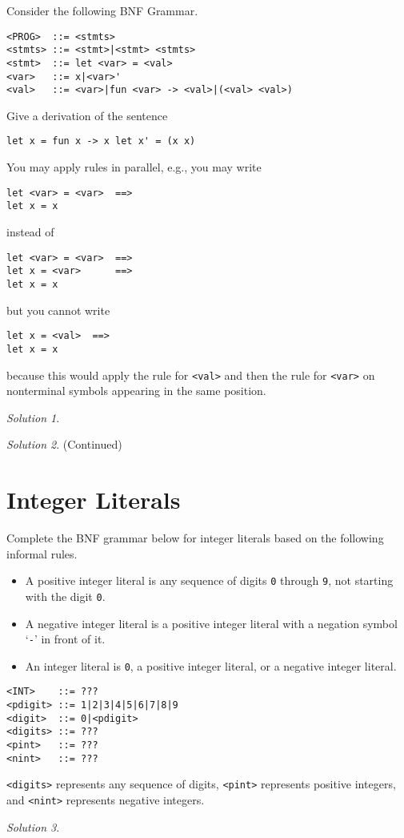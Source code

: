 \documentclass{article}
\theoremstyle{remark} \newtheorem*{solution}{Solution}
\begin{document}
Consider the following BNF Grammar.
\begin{lstlisting}
<PROG>  ::= <stmts>
<stmts> ::= <stmt>|<stmt> <stmts>
<stmt>  ::= let <var> = <val>
<var>   ::= x|<var>'
<val>   ::= <var>|fun <var> -> <val>|(<val> <val>)
\end{lstlisting}
Give a derivation of the sentence
\begin{lstlisting}
let x = fun x -> x let x' = (x x)
\end{lstlisting}
You may apply rules in parallel, e.g., you may write
\begin{lstlisting}
let <var> = <var>  ==>
let x = x
\end{lstlisting}
instead of
\begin{lstlisting}
let <var> = <var>  ==>
let x = <var>      ==>
let x = x
\end{lstlisting}
but you cannot write
\begin{lstlisting}
let x = <val>  ==>
let x = x
\end{lstlisting}
because this would apply the rule for \texttt{<val>} and then the rule
for \texttt{<var>} on nonterminal symbols appearing in the same
position.

\begin{solution}
\end{solution}

\pagebreak
\begin{solution}
(Continued)
\end{solution}

\pagebreak
\section{Integer Literals}

Complete the BNF grammar below for integer literals based on the following informal rules.
\begin{itemize}
\item A positive integer literal is any sequence of digits \texttt{0} through \texttt{9}, not starting with the digit \texttt{0}.
\item A negative integer literal is a positive integer literal with a negation symbol `\texttt{-}' in front of it.
\item An integer literal is \texttt{0}, a positive integer literal, or a negative integer literal.
\end{itemize}

\begin{lstlisting}
<INT>    ::= ???
<pdigit> ::= 1|2|3|4|5|6|7|8|9
<digit>  ::= 0|<pdigit>
<digits> ::= ???
<pint>   ::= ???
<nint>   ::= ???
\end{lstlisting}
\texttt{<digits>} represents any sequence of digits, \texttt{<pint>}
represents positive integers, and \texttt{<nint>} represents negative
integers.

\begin{solution}
\end{solution}
\end{document}
